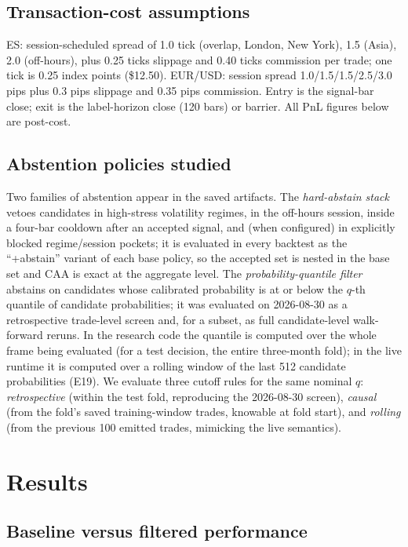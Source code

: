 \documentclass[10pt]{article}
\begin{document}
\subsection{Transaction-cost assumptions}

ES: session-scheduled spread of 1.0 tick (overlap, London, New York), 1.5 (Asia), 2.0 (off-hours), plus 0.25 ticks slippage and 0.40 ticks commission per trade; one tick is 0.25 index points (\$12.50). EUR/USD: session spread 1.0/1.5/1.5/2.5/3.0 pips plus 0.3 pips slippage and 0.35 pips commission. Entry is the signal-bar close; exit is the label-horizon close (120 bars) or barrier. All PnL figures below are post-cost.

\subsection{Abstention policies studied}

Two families of abstention appear in the saved artifacts. The \emph{hard-abstain stack} vetoes candidates in high-stress volatility regimes, in the off-hours session, inside a four-bar cooldown after an accepted signal, and (when configured) in explicitly blocked regime/session pockets; it is evaluated in every backtest as the ``+abstain'' variant of each base policy, so the accepted set is nested in the base set and CAA is exact at the aggregate level. The \emph{probability-quantile filter} abstains on candidates whose calibrated probability is at or below the $q$-th quantile of candidate probabilities; it was evaluated on 2026-08-30 as a retrospective trade-level screen and, for a subset, as full candidate-level walk-forward reruns. In the research code the quantile is computed over the whole frame being evaluated (for a test decision, the entire three-month fold); in the live runtime it is computed over a rolling window of the last 512 candidate probabilities (E19). We evaluate three cutoff rules for the same nominal $q$: \emph{retrospective} (within the test fold, reproducing the 2026-08-30 screen), \emph{causal} (from the fold's saved training-window trades, knowable at fold start), and \emph{rolling} (from the previous 100 emitted trades, mimicking the live semantics).

\section{Results}
\label{sec:results}

\subsection{Baseline versus filtered performance}
\end{document}
